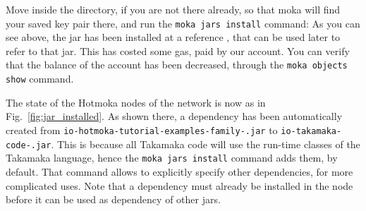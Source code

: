 Move inside the \texttt{\hotmokaTutorialDir{}} directory, if you are not
there already, so that
moka will find your saved key pair there, and run the \texttt{moka jars install} command:
%
%
As you can see above, the jar has been installed at a reference
\texttt{\familyAddressShort{}}, that can be used
later to refer to that jar. This has costed some gas, paid by our account.
You can verify that the balance of the account has been decreased, through the
\texttt{moka objects show} command.

The state of the Hotmoka nodes of the network is now as in Fig.~\ref{fig:jar_installed}.
As shown there, a dependency has been automatically created
from \texttt{io-hotmoka-tutorial-examples-family-\hotmokaVersion{}.jar} to
\texttt{io-takamaka-code-\takamakaVersion{}.jar}. This is because all Takamaka code
will use the run-time classes of the Takamaka language,
hence the \texttt{moka jars install} command adds them, by default.
That command allows to explicitly specify other dependencies, for more complicated uses.
Note that a dependency must already be installed in the node
before it can be used as dependency of other jars.
%
